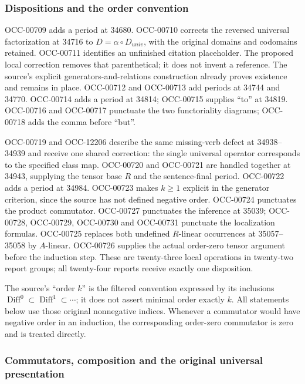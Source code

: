 \subsubsection{Dispositions and the order convention}\label{algebra-proof-043-dispositions-and-the-order-convention}

OCC-00709 adds a period at 34680. OCC-00710 corrects the reversed universal factorization at 34716 to \(D=\alpha\circ D_{univ}\), with the original domains and codomains retained. OCC-00711 identifies an unfinished citation placeholder. The proposed local correction removes that parenthetical; it does not invent a reference. The source's explicit generators-and-relations construction already proves existence and remains in place. OCC-00712 and OCC-00713 add periods at 34744 and 34770. OCC-00714 adds a period at 34814; OCC-00715 supplies ``to'' at 34819. OCC-00716 and OCC-00717 punctuate the two functoriality diagrams; OCC-00718 adds the comma before ``but''.

OCC-00719 and OCC-12206 describe the same missing-verb defect at 34938--34939 and receive one shared correction: the single universal operator corresponds to the specified class map. OCC-00720 and OCC-00721 are handled together at 34943, supplying the tensor base \(R\) and the sentence-final period. OCC-00722 adds a period at 34984. OCC-00723 makes \(k\ge1\) explicit in the generator criterion, since the source has not defined negative order. OCC-00724 punctuates the product commutator. OCC-00727 punctuates the inference at 35039; OCC-00728, OCC-00729, OCC-00730 and OCC-00731 punctuate the localization formulas. OCC-00725 replaces both undefined \(R\)-linear occurrences at 35057--35058 by \(A\)-linear. OCC-00726 supplies the actual order-zero tensor argument before the induction step. These are twenty-three local operations in twenty-two report groups; all twenty-four reports receive exactly one disposition.

The source's ``order \(k\)'' is the filtered convention expressed by its inclusions \(\operatorname{Diff}^0\subset\operatorname{Diff}^1\subset\cdots\); it does not assert minimal order exactly \(k\). All statements below use those original nonnegative indices. Whenever a commutator would have negative order in an induction, the corresponding order-zero commutator is zero and is treated directly.

\subsubsection{Commutators, composition and the original universal presentation}\label{algebra-proof-043-commutators-composition-and-the-original-universal-presentation}

